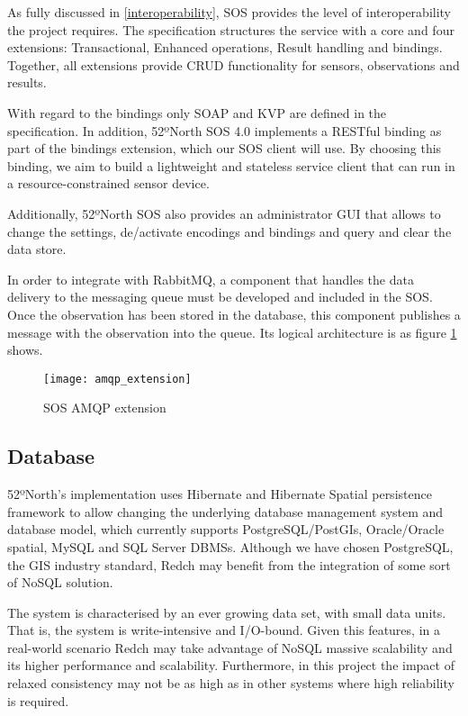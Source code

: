 As fully discussed in \ref{interoperability}, SOS provides the level of interoperability the project requires. The specification structures the service with a core and four extensions: Transactional, Enhanced operations, Result handling and bindings. Together, all extensions provide CRUD functionality for sensors, observations and results.

With regard to the bindings only SOAP and KVP are defined in the specification. In addition, 52ºNorth SOS 4.0 implements a RESTful binding as part of the bindings extension, which our SOS client will use. By choosing this binding, we aim to build a lightweight and stateless service client that can run in a resource-constrained sensor device.

Additionally, 52ºNorth SOS also provides an administrator GUI that allows to change the settings, de/activate encodings and bindings and query and clear the data store.

In order to integrate with RabbitMQ, a component that handles the data delivery to the messaging queue must be developed and included in the SOS. Once the observation has been stored in the database, this component publishes a message with the observation into the queue. Its logical architecture is as figure \ref{fig:amqp_extension} shows.

\begin{figure}[p]
	\centering
	\texttt{[image: amqp\_extension]}
	\caption{SOS AMQP extension}
	\label{fig:amqp_extension}
\end{figure}

\subsection{Database}

52ºNorth's implementation uses Hibernate and Hibernate Spatial persistence framework to allow changing the underlying database management system and database model, which currently supports PostgreSQL/PostGIs, Oracle/Oracle spatial, MySQL and SQL Server DBMSs. Although we have chosen PostgreSQL, the GIS industry standard, Redch may benefit from the integration of some sort of NoSQL solution.

The system is characterised by an ever growing data set, with small data units. That is, the system is write-intensive and I/O-bound. Given this features, in a real-world scenario Redch may take advantage of NoSQL massive scalability and its higher performance and scalability. Furthermore, in this project the impact of relaxed consistency may not be as high as in other systems where high reliability is required.

